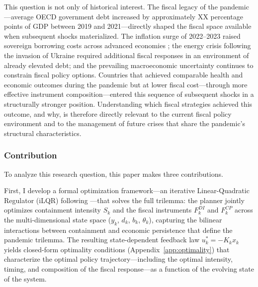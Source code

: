 This question is not only of historical interest. The fiscal legacy of the
pandemic---average OECD government debt increased by approximately XX percentage
points of GDP between 2019 and 2021---directly shaped the fiscal space available when
subsequent shocks materialized. The inflation surge of 2022--2023 raised sovereign
borrowing costs across advanced economies \citep{jorda2023}; the energy crisis
following the invasion of Ukraine required additional fiscal responses in an
environment of already elevated debt; and the prevailing macroeconomic uncertainty
continues to constrain fiscal policy options. Countries that achieved comparable health
and economic outcomes during the pandemic but at lower fiscal cost---through more
effective instrument composition---entered this sequence of subsequent shocks in a
structurally stronger position. Understanding which fiscal strategies achieved this
outcome, and why, is therefore directly relevant to the current fiscal policy
environment and to the management of future crises that share the pandemic's
structural characteristics.




























\subsubsection{Contribution}
To analyze this research question, this paper makes three contributions.

First, I develop a formal optimization framework---an iterative Linear-Quadratic Regulator (iLQR) following \citet{bertsekas2017}---that solves the full trilemma: the planner jointly optimizes containment
intensity $S_k$ and the fiscal instruments $F_k^{DI}$ and $F_k^{CP}$ across the multi-dimensional state space ($y_k$, $d_k$, $b_k$, $\theta_k$), capturing the bilinear interactions between containment and economic persistence that define the pandemic trilemma. The resulting state-dependent feedback law $u_k^* = -K_k x_k$ yields closed-form optimality conditions (Appendix~\ref{app:optimality}) that characterize the optimal policy trajectory---including the optimal intensity, timing,
and composition of the fiscal response---as a function of the evolving state of the system.

